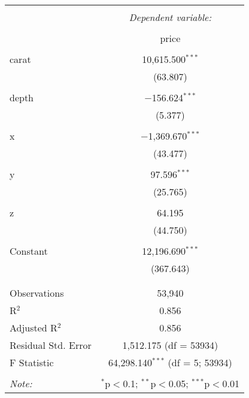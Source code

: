 
\begin{tabular}{@{\extracolsep{5pt}}lc} 
\\[-1.8ex]\hline 
\hline \\[-1.8ex] 
 & \multicolumn{1}{c}{\textit{Dependent variable:}} \\ 
\cline{2-2} 
\\[-1.8ex] & price \\ 
\hline \\[-1.8ex] 
 carat & 10,615.500$^{***}$ \\ 
  & (63.807) \\ 
  & \\ 
 depth & $-$156.624$^{***}$ \\ 
  & (5.377) \\ 
  & \\ 
 x & $-$1,369.670$^{***}$ \\ 
  & (43.477) \\ 
  & \\ 
 y & 97.596$^{***}$ \\ 
  & (25.765) \\ 
  & \\ 
 z & 64.195 \\ 
  & (44.750) \\ 
  & \\ 
 Constant & 12,196.690$^{***}$ \\ 
  & (367.643) \\ 
  & \\ 
\hline \\[-1.8ex] 
Observations & 53,940 \\ 
R$^{2}$ & 0.856 \\ 
Adjusted R$^{2}$ & 0.856 \\ 
Residual Std. Error & 1,512.175 (df = 53934) \\ 
F Statistic & 64,298.140$^{***}$ (df = 5; 53934) \\ 
\hline 
\hline \\[-1.8ex] 
\textit{Note:}  & \multicolumn{1}{r}{$^{*}$p$<$0.1; $^{**}$p$<$0.05; $^{***}$p$<$0.01} \\ 
\end{tabular} 
